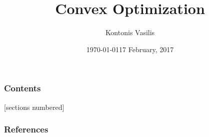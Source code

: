 \documentclass[10pt]{beamer}
\begin{document}
\title{Convex Optimization}
\subtitle{}
\date{\today}
\author{Kontonis Vasilis}

\date{17 February, 2017}
\maketitle


\begin{frame}
  \frametitle{Contents}
  [sections numbered]
  \tableofcontents[hideallsubsections]
\end{frame}






\nocite{boyd_convex_2004}
\nocite{lobo_applications_1998}

\begin{frame}[allowframebreaks]
  \frametitle{References}
  
  
\end{frame}
\end{document}
